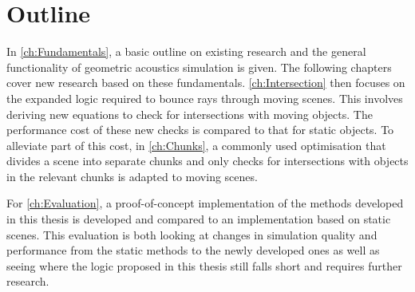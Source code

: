 \section{Outline}

In \autoref{ch:Fundamentals}, a basic outline on existing research and the general functionality of geometric acoustics simulation is given.
The following chapters cover new research based on these fundamentals.
\newline
\autoref{ch:Intersection} then focuses on the expanded logic required to bounce rays through moving scenes.
This involves deriving new equations to check for intersections with moving objects.
The performance cost of these new checks is compared to that for static objects.
\newline
To alleviate part of this cost, in \autoref{ch:Chunks},
a commonly used optimisation that divides a scene into separate chunks and only checks for intersections with objects in the relevant chunks
is adapted to moving scenes.
\iffalse
    \newline
    irs ch5
\fi
\newline
For \autoref{ch:Evaluation}, a proof-of-concept implementation of the methods developed in this thesis is developed
and compared to an implementation based on static scenes.
This evaluation is both looking at changes in simulation quality and performance from the static methods to the newly developed ones
as well as seeing where the logic proposed in this thesis still falls short and requires further research.